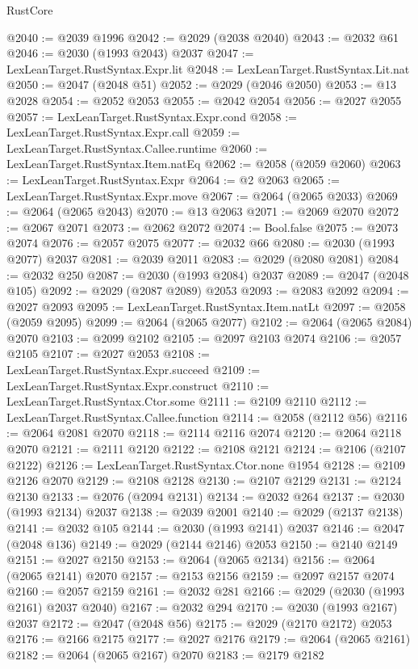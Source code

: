 \begin{lexlean}{RustCore}
\begin{coremodule}
@2040 := @2039 @1996
@2042 := @2029 (@2038 @2040)
@2043 := @2032 @61
@2046 := @2030 (@1993 @2043) @2037
@2047 := LexLeanTarget.RustSyntax.Expr.lit
@2048 := LexLeanTarget.RustSyntax.Lit.nat
@2050 := @2047 (@2048 @51)
@2052 := @2029 (@2046 @2050)
@2053 := @13 @2028
@2054 := @2052 @2053
@2055 := @2042 @2054
@2056 := @2027 @2055
@2057 := LexLeanTarget.RustSyntax.Expr.cond
@2058 := LexLeanTarget.RustSyntax.Expr.call
@2059 := LexLeanTarget.RustSyntax.Callee.runtime
@2060 := LexLeanTarget.RustSyntax.Item.natEq
@2062 := @2058 (@2059 @2060)
@2063 := LexLeanTarget.RustSyntax.Expr
@2064 := @2 @2063
@2065 := LexLeanTarget.RustSyntax.Expr.move
@2067 := @2064 (@2065 @2033)
@2069 := @2064 (@2065 @2043)
@2070 := @13 @2063
@2071 := @2069 @2070
@2072 := @2067 @2071
@2073 := @2062 @2072
@2074 := Bool.false
@2075 := @2073 @2074
@2076 := @2057 @2075
@2077 := @2032 @66
@2080 := @2030 (@1993 @2077) @2037
@2081 := @2039 @2011
@2083 := @2029 (@2080 @2081)
@2084 := @2032 @250
@2087 := @2030 (@1993 @2084) @2037
@2089 := @2047 (@2048 @105)
@2092 := @2029 (@2087 @2089) @2053
@2093 := @2083 @2092
@2094 := @2027 @2093
@2095 := LexLeanTarget.RustSyntax.Item.natLt
@2097 := @2058 (@2059 @2095)
@2099 := @2064 (@2065 @2077)
@2102 := @2064 (@2065 @2084) @2070
@2103 := @2099 @2102
@2105 := @2097 @2103 @2074
@2106 := @2057 @2105
@2107 := @2027 @2053
@2108 := LexLeanTarget.RustSyntax.Expr.succeed
@2109 := LexLeanTarget.RustSyntax.Expr.construct
@2110 := LexLeanTarget.RustSyntax.Ctor.some
@2111 := @2109 @2110
@2112 := LexLeanTarget.RustSyntax.Callee.function
@2114 := @2058 (@2112 @56)
@2116 := @2064 @2081 @2070
@2118 := @2114 @2116 @2074
@2120 := @2064 @2118 @2070
@2121 := @2111 @2120
@2122 := @2108 @2121
@2124 := @2106 (@2107 @2122)
@2126 := LexLeanTarget.RustSyntax.Ctor.none @1954
@2128 := @2109 @2126 @2070
@2129 := @2108 @2128
@2130 := @2107 @2129
@2131 := @2124 @2130
@2133 := @2076 (@2094 @2131)
@2134 := @2032 @264
@2137 := @2030 (@1993 @2134) @2037
@2138 := @2039 @2001
@2140 := @2029 (@2137 @2138)
@2141 := @2032 @105
@2144 := @2030 (@1993 @2141) @2037
@2146 := @2047 (@2048 @136)
@2149 := @2029 (@2144 @2146) @2053
@2150 := @2140 @2149
@2151 := @2027 @2150
@2153 := @2064 (@2065 @2134)
@2156 := @2064 (@2065 @2141) @2070
@2157 := @2153 @2156
@2159 := @2097 @2157 @2074
@2160 := @2057 @2159
@2161 := @2032 @281
@2166 := @2029 (@2030 (@1993 @2161) @2037 @2040)
@2167 := @2032 @294
@2170 := @2030 (@1993 @2167) @2037
@2172 := @2047 (@2048 @56)
@2175 := @2029 (@2170 @2172) @2053
@2176 := @2166 @2175
@2177 := @2027 @2176
@2179 := @2064 (@2065 @2161)
@2182 := @2064 (@2065 @2167) @2070
@2183 := @2179 @2182

\end{coremodule}
\end{lexlean}
